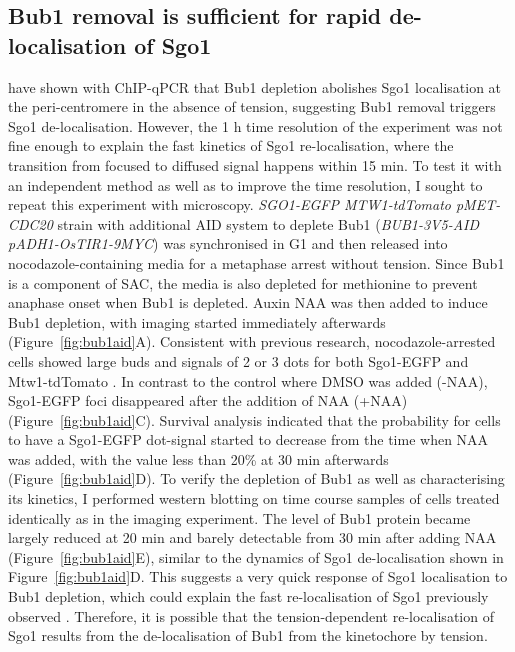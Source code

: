 \subsection{Bub1 removal is sufficient for rapid de-localisation of Sgo1}

\cite{Nerusheva2014} have shown with ChIP-qPCR that Bub1 depletion abolishes Sgo1 localisation at the peri-centromere in the absence of tension, suggesting Bub1 removal triggers Sgo1 de-localisation. However, the 1 \si{\hour} time resolution of the experiment was not fine enough to explain the fast kinetics of Sgo1 re-localisation, where the transition from focused to diffused signal happens within 15 \si{\minute}. To test it with an independent method as well as to improve the time resolution, I sought to repeat this experiment with microscopy. \textit{SGO1-EGFP MTW1-tdTomato pMET-CDC20} strain with additional AID system to deplete Bub1 (\textit{BUB1-3V5-AID} \textit{pADH1-OsTIR1-9MYC}) was synchronised in G1 and then released into nocodazole-containing media for a metaphase arrest without tension. Since Bub1 is a component of SAC, the media is also depleted for methionine to prevent anaphase onset when Bub1 is depleted. Auxin NAA was then added to induce Bub1 depletion, with imaging started immediately afterwards (Figure~\ref{fig:bub1aid}A). Consistent with previous research, nocodazole-arrested cells showed large buds and signals of 2 or 3 dots for both Sgo1-EGFP and Mtw1-tdTomato \citep{Richmond2013Slk19Attachment}. In contrast to the control where DMSO was added (-NAA), Sgo1-EGFP foci disappeared after the addition of NAA (+NAA) (Figure~\ref{fig:bub1aid}C). Survival analysis indicated that the probability for cells to have a Sgo1-EGFP dot-signal started to decrease from the time when NAA was added, with the value less than 20\% at 30 \si{\minute} afterwards (Figure~\ref{fig:bub1aid}D). To verify the depletion of Bub1 as well as characterising its kinetics, I performed western blotting on time course samples of cells treated identically as in the imaging experiment. The level of Bub1 protein became largely reduced at 20 \si{\minute} and barely detectable from 30 \si{\minute} after adding NAA (Figure~\ref{fig:bub1aid}E), similar to the dynamics of Sgo1 de-localisation shown in Figure~\ref{fig:bub1aid}D. This suggests a very quick response of Sgo1 localisation to Bub1 depletion, which could explain the fast re-localisation of Sgo1 previously observed \citep{Nerusheva2014}. Therefore, it is possible that the tension-dependent re-localisation of Sgo1 results from the de-localisation of Bub1 from the kinetochore by tension. 

